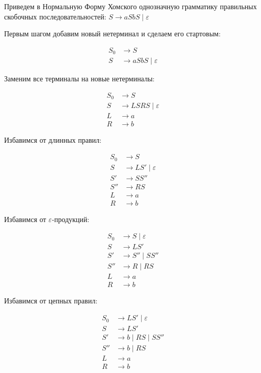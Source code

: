 \begin{example}
  Приведем в Нормальную Форму Хомского однозначную грамматику правильных скобочных последовательностей: $S \to a S b S \mid \varepsilon$

  Первым шагом добавим новый нетерминал и сделаем его стартовым: 

  \begin{align*}
    S_0 &\to S  \\ 
    S   &\to a S b S \mid \varepsilon
  \end{align*}

  Заменим все терминалы на новые нетерминалы: 

  \begin{align*}
    S_0 &\to S \\ 
    S   &\to L S R S \mid \varepsilon \\ 
    L   &\to a \\ 
    R   &\to b
  \end{align*}

  Избавимся от длинных правил: 

  \begin{align*}
    S_0 &\to S \\ 
    S   &\to L S' \mid \varepsilon \\ 
    S'  &\to S S'' \\ 
    S'' &\to R S \\
    L   &\to a \\ 
    R   &\to b
  \end{align*}

  Избавимся от $\varepsilon$-продукций: 

  \begin{align*}
    S_0 &\to S \mid \varepsilon \\ 
    S   &\to L S' \\ 
    S'  &\to S'' \mid S S'' \\ 
    S'' &\to R   \mid R S \\
    L   &\to a \\ 
    R   &\to b
  \end{align*}

  Избавимся от цепных правил: 

  \begin{align*}
    S_0 &\to L S' \mid \varepsilon \\ 
    S   &\to L S' \\ 
    S'  &\to b \mid R S \mid S S'' \\ 
    S'' &\to b \mid R S \\
    L   &\to a \\ 
    R   &\to b
  \end{align*}
\end{example}


